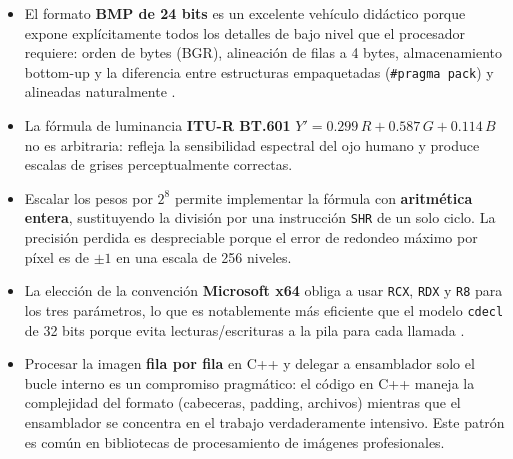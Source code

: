 \documentclass[12pt, letterpaper]{article}
\begin{document}
\begin{itemize}
    \item El formato \textbf{BMP de 24 bits} es un excelente vehículo didáctico porque expone explícitamente todos los detalles de bajo nivel que el procesador requiere: orden de bytes (BGR), alineación de filas a 4 bytes, almacenamiento bottom-up y la diferencia entre estructuras empaquetadas (\texttt{\#pragma pack}) y alineadas naturalmente \cite{microsoft_bmp, fileformat_bmp}.

    \item La fórmula de luminancia \textbf{ITU-R BT.601} $Y' = 0.299\,R + 0.587\,G + 0.114\,B$ no es arbitraria: refleja la sensibilidad espectral del ojo humano y produce escalas de grises perceptualmente correctas.

    \item Escalar los pesos por $2^8$ permite implementar la fórmula con \textbf{aritmética entera}, sustituyendo la división por una instrucción \texttt{SHR} de un solo ciclo. La precisión perdida es despreciable porque el error de redondeo máximo por píxel es de $\pm 1$ en una escala de 256 niveles.

    \item La elección de la convención \textbf{Microsoft x64} obliga a usar \texttt{RCX}, \texttt{RDX} y \texttt{R8} para los tres parámetros, lo que es notablemente más eficiente que el modelo \texttt{cdecl} de 32 bits porque evita lecturas/escrituras a la pila para cada llamada \cite{msft_x64_calling}.

    \item Procesar la imagen \textbf{fila por fila} en C++ y delegar a ensamblador solo el bucle interno es un compromiso pragmático: el código en C++ maneja la complejidad del formato (cabeceras, padding, archivos) mientras que el ensamblador se concentra en el trabajo verdaderamente intensivo. Este patrón es común en bibliotecas de procesamiento de imágenes profesionales.
\end{itemize}
\end{document}

